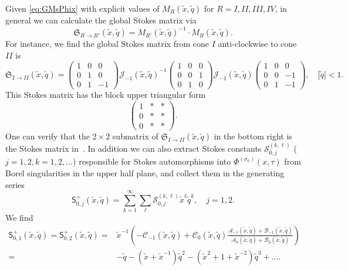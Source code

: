 \documentclass[12pt,reqno]{amsart}
\theoremstyle{definition}
\def\s{\sigma}
\def\tq{\tilde{q}}
\def\tx{\tilde{x}}
\def\tx{\tilde{x}}
\def\mc{\mathcal}
\def\mf{\mathfrak}
\def\ms{\mathsf}
\newcommand{\nn}{\nonumber \\}
\begin{document}
Given \eqref{eq:GMsPhix} with explicit values of $M_R(\tx,\tq)$ for
$R=I,II,III,IV$, in general we can calculate the global Stokes matrix
via
\begin{equation}
  \mf{S}_{R\rightarrow R'}(\tx,\tq) = M_{R'}(\tx,\tq)^{-1} \cdot M_{R}(\tx,\tq).
  \label{eq:SMMx}
\end{equation}
For instance, we find the global Stokes matrix from cone $I$
anti-clockwise to cone $II$ is 
\begin{equation}
  \mf{S}_{I\rightarrow II}(\tx,\tq) =
  \begin{pmatrix}
    1&0&0\\
    0&1&0\\
    0&1&-1
  \end{pmatrix}
  \mc{J}_{-1}(\tx,\tq)^{-1}
  \begin{pmatrix}
    1&0&0\\
    0&0&1\\
    0&1&0
  \end{pmatrix}
  \mc{J}_{-1}(\tx,\tq)
  \begin{pmatrix}
    1&0&0\\
    0&0&-1\\
    0&1&-1
  \end{pmatrix},\quad |\tq|<1.\label{eq:S12x}
\end{equation}
This Stokes matrix has the block upper triangular form
\begin{equation}
    \begin{pmatrix}
    1&*&*\\
    0&*&*\\
    0&*&*
  \end{pmatrix}.\label{eq:1bdx}
\end{equation}
One can verify that the $2\times 2$
submatrix of $\mf{S}_{I\rightarrow II}(\tx,\tq)$ in the bottom right
is the Stokes matrix in~\cite{GGM:resurgent}. In addition we can also
extract Stokes constants $\mc{S}_{0,j}^{(k,\ell)}$
($j=1,2, k=1,2,\ldots$) responsible for Stokes automorphisms into
$\Phi^{(\s_0)}(x,\tau)$ from Borel singularities in the upper half
plane, and collect them in the generating series
\begin{equation}
  \ms{S}^+_{0,j}(\tx,\tq) = \sum_{k=1}^\infty\sum_{\ell}
  \mc{S}_{0,j}^{(k,\ell)}\tx^\ell\tq^k,\quad j=1,2.
\end{equation}
We find 
\begin{align}
  \ms{S}_{0,1}^+(\tx,\tq) = \ms{S}_{0,2}^+(\tx,\tq) =
  &\tx^{-1}\left(-\mc{C}_{-1}(\tx,\tq)+\mc{C}_0(\tx,\tq)
    \frac{\mc{A}_{-1}(\tx,\tq)+\mc{B}_{-1}(\tx,\tq)}
    {\mc{A}_0(\tx,\tq)+\mc{B}_0(\tx,\tq)}
    \right)
    \nn=
  &-\tq-(\tx+\tx^{-1})\tq^2
    -(\tx^2+1+\tx^{-2})\tq^3+\ldots.
\end{align}
\end{document}
